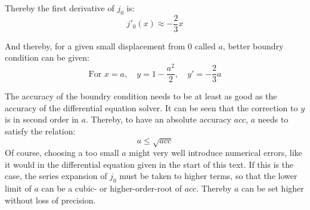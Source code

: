 \documentclass[twocolumn]{article}
\begin{document}
Thereby the first derivative of $j_0$ is:
\begin{equation}
j'_0(x) \approx -\frac{2}{3}x
\end{equation}

And thereby, for a given small displacement from 0 called $a$, better boundry condition can be given:
\begin{equation}
\textrm{For } x = a, \quad y = 1 - \frac{a^2}{2},\quad y'= -\frac{2}{3}a
\end{equation}

The accuracy of the boundry condition needs to be at least as good as the accuracy of the differential equation solver. It can be seen that the correction to $y$ is in second order in $a$. Thereby, to have an absolute accuracy $acc$, $a$ needs to satisfy the relation:
\begin{equation}
a \leq \sqrt{acc}
\end{equation}
Of course, choosing a too small $a$ might very well introduce numerical errors, like it would in the differential equation given in the start of this text. If this is the case, the series expansion of $j_0$ must be taken to higher terms, so that the lower limit of $a$ can be a cubic- or higher-order-root of $acc$. Thereby $a$ can be set higher without loss of precision.

{}

\end{document}
